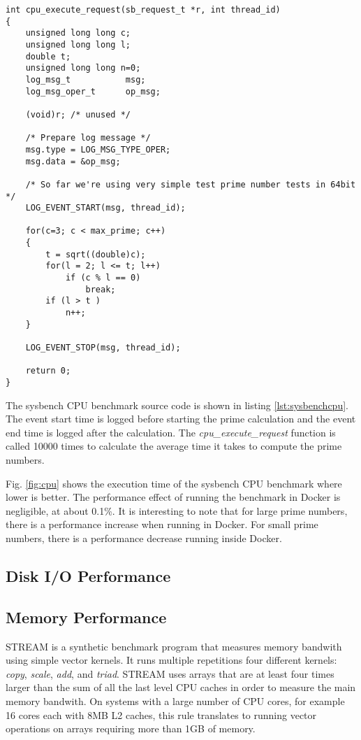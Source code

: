 \documentclass[11pt]{article}
\begin{document}
\lstset{caption=Sysbench CPU Benchmark Source Code, label=lst:sysbenchcpu}
\begin{lstlisting}
int cpu_execute_request(sb_request_t *r, int thread_id)
{
	unsigned long long c;
	unsigned long long l;
	double t;
	unsigned long long n=0;
	log_msg_t           msg;
	log_msg_oper_t      op_msg;
	
	(void)r; /* unused */
	
	/* Prepare log message */
	msg.type = LOG_MSG_TYPE_OPER;
	msg.data = &op_msg;
	
	/* So far we're using very simple test prime number tests in 64bit */
	LOG_EVENT_START(msg, thread_id);
	
	for(c=3; c < max_prime; c++)  
	{
		t = sqrt((double)c);
		for(l = 2; l <= t; l++)
			if (c % l == 0)
				break;
		if (l > t )
			n++; 
	}
	
	LOG_EVENT_STOP(msg, thread_id);
	
	return 0;
}
\end{lstlisting}

The sysbench CPU benchmark source code is shown in listing \ref{lst:sysbenchcpu}. The event start time is logged before starting the prime calculation and the event end time is logged after the calculation. The \textit{cpu\_execute\_request} function is called 10000 times to calculate the average time it takes to compute the prime numbers. 

Fig. \ref{fig:cpu} shows the execution time of the sysbench CPU benchmark where lower is better. The performance effect of running the benchmark in Docker is negligible, at about 0.1\%. It is interesting to note that for large prime numbers, there is a performance increase when running in Docker. For small prime numbers, there is a performance decrease running inside Docker.

\subsection{Disk I/O Performance}


\subsection{Memory Performance}
STREAM is a synthetic benchmark program that measures memory bandwith using simple vector kernels. It runs multiple repetitions four different kernels: \textit{copy}, \textit{scale}, \textit{add}, and \textit{triad}. STREAM uses arrays that are at least four times larger than the sum of all the last level CPU caches in order to measure the main memory bandwith. On systems with a large number of CPU cores, for example 16 cores each with 8MB L2 caches, this rule translates to running vector operations on arrays requiring more than 1GB of memory. 
\end{document}
